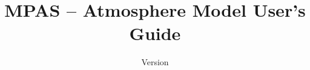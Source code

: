 \documentclass[11pt]{report}
\begin{document}
\title{MPAS -- Atmosphere Model User's Guide}

\author{Version \version}

\maketitle



\tableofcontents










\appendix


\end{document}
